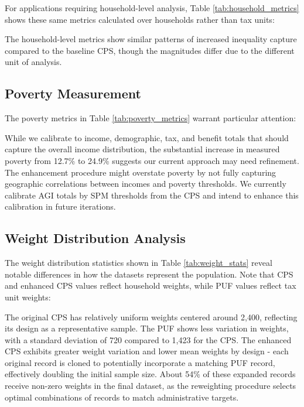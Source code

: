 For applications requiring household-level analysis, Table \ref{tab:household_metrics} shows these same metrics calculated over households rather than tax units:



The household-level metrics show similar patterns of increased inequality capture compared to the baseline CPS, though the magnitudes differ due to the different unit of analysis.

\subsection{Poverty Measurement}

The poverty metrics in Table \ref{tab:poverty_metrics} warrant particular attention:



While we calibrate to income, demographic, tax, and benefit totals that should capture the overall income distribution, the substantial increase in measured poverty from 12.7\% to 24.9\% suggests our current approach may need refinement. The enhancement procedure might overstate poverty by not fully capturing geographic correlations between incomes and poverty thresholds. We currently calibrate AGI totals by SPM thresholds from the CPS and intend to enhance this calibration in future iterations.

\subsection{Weight Distribution Analysis}

The weight distribution statistics shown in Table \ref{tab:weight_stats} reveal notable differences in how the datasets represent the population. Note that CPS and enhanced CPS values reflect household weights, while PUF values reflect tax unit weights:



The original CPS has relatively uniform weights centered around 2,400, reflecting its design as a representative sample. The PUF shows less variation in weights, with a standard deviation of 720 compared to 1,423 for the CPS. The enhanced CPS exhibits greater weight variation and lower mean weights by design - each original record is cloned to potentially incorporate a matching PUF record, effectively doubling the initial sample size. About 54\% of these expanded records receive non-zero weights in the final dataset, as the reweighting procedure selects optimal combinations of records to match administrative targets.

